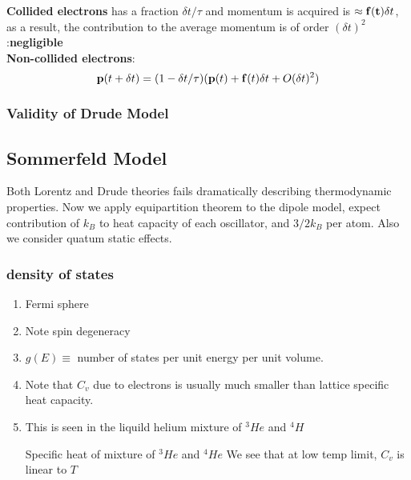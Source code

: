 \documentclass[12pt,a4paper]{article}
\begin{document}
        \indent \textbf{Collided electrons} has a fraction $\delta t/\tau$ and momentum is acquired is $\approx \vb{f(t)}\delta t$, as a result, the contribution to the average momentum is of order $(\delta t)^2$ :\textbf{negligible}\\
        \indent \textbf{Non-collided electrons}: 
        \begin{equation}
            \vb{p}(t+\delta t) = (1- \delta t/\tau)(\vb{p}(t)+\vb{f}(t)\delta t+ O(\delta t)^2)
        \end{equation}
    \subsubsection{Validity of Drude Model}
    \subsection{Sommerfeld Model}
        Both Lorentz and Drude theories fails dramatically describing thermodynamic properties. 
        Now we apply equipartition theorem to the dipole model, expect contribution of $k_B$ to heat capacity of each oscillator, and $3/2k_B$ per atom.
        Also we consider quatum static effects.
        \subsubsection{density of states}
            \begin{enumerate}
                \item Fermi sphere
                \item Note spin degeneracy 
                \item $g(E)\equiv$ number of states per unit energy per unit volume.
                \item Note that $C_v$ due to electrons is usually much smaller than lattice specific heat capacity.
                \item {This is seen in the liquild helium mixture of ${}^{3}He$ and ${}^{4}H$
                \begin{example}
                    {Specific heat of mixture of ${}^{3}He$ and ${}^{4}He$}
                    {We see that at low temp limit, $C_v$ is linear to $T$}
                \end{example}
                }
            \end{enumerate}
\end{document}
